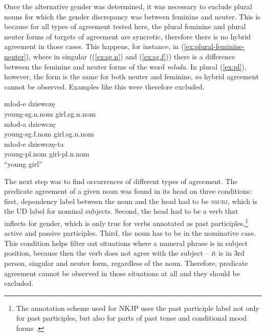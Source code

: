 Once the alternative gender was determined, it was necessary to exclude plural nouns for which the gender discrepancy was between feminine and neuter. This is because for all types of agreement tested here, the plural feminine and plural neuter forms of targets of agreement are syncretic, therefore there is no hybrid agreement in those cases. This happens, for instance, in (\ref{ex:plural-feminine-neuter}), where in singular ((\ref{ex:sg.n}) and (\ref{ex:sg.f})) there is a difference between the feminine and neuter forms of the word \textsl{młoda}. In plural (\ref{ex:pl}), however, the form is the same for both neuter and feminine, so hybrid agreement cannot be observed. Examples like this were therefore excluded.

\begin{exe}
  \ex\label{ex:plural-feminine-neuter}
  \begin{xlist}
    \ex\label{ex:sg.n}
    \gll młod-e dziewczę\\
    young-sg.n.nom girl.sg.n.nom\\
    \ex\label{ex:sg.f}
    \gll młod-a dziewczę\\
    young-sg.f.nom girl.sg.n.nom\\
    \ex\label{ex:pl}
    \gll młod-e dziewczę-ta\\
    young-pl.nom girl-pl.n.nom\\
    \trans ``young girl''
  \end{xlist}
\end{exe}

The next step was to find occurrences of different types of agreement. The predicate agreement of a given noun was found in its head on three conditions: first, dependency label between the noun and the head had to be \textsc{nsubj}, which is the UD label for nominal subjects. Second, the head had to be a verb that inflects for gender, which is only true for verbs annotated as past participles,\footnote{The annotation scheme used for NKJP uses the past participle label not only for past participles, but also for parts of past tense and conditional mood forms \citep{przepiorkowski_narodowy_2012}.} active and passive participles. Third, the noun has to be in the nominative case. This condition helps filter out situations where a numeral phrase is in subject position, because then the verb does not agree with the subject -- it is in 3rd person, singular and neuter form, regardless of the noun. Therefore, predicate agreement cannot be observed in those situations at all and they should be excluded.

